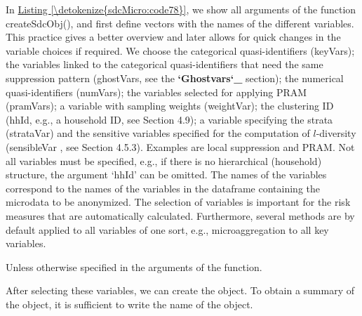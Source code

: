 \documentclass[letterpaper,10pt,english]{sphinxmanual}
\begin{document}
In \hyperref[\detokenize{sdcMicro:code78}]{Listing \ref{\detokenize{sdcMicro:code78}}}, we show all arguments of the function createSdcObj(),
and first define vectors with the names of the different variables. This
practice gives a better overview and later allows for quick changes in
the variable choices if required. We choose the categorical
quasi-identifiers (keyVars); the variables linked to the categorical
quasi-identifiers that need the same suppression pattern (ghostVars, see the
{\color{red}\bfseries{}{}`Ghostvars{}`\_} section); the numerical quasi-identifiers (numVars); the variables
selected for applying PRAM (pramVars); a variable with sampling weights
(weightVar); the clustering ID (hhId, e.g., a household ID, see Section
4.9); a variable specifying the strata (strataVar) and the sensitive
variables specified for the computation of \(l\)-diversity
(sensibleVar , see Section 4.5.3).  Examples are local suppression and
PRAM. Not all variables must be specified, e.g., if there is no
hierarchical (household) structure, the argument ‘hhId’ can be omitted.
The names of the variables correspond to the names of the variables in
the dataframe containing the microdata to be anonymized. The selection
of variables is important for the risk measures that are automatically
calculated. Furthermore, several methods are by default applied to all
variables of one sort, e.g., microaggregation to all key
variables. %
\begin{footnote}[8]\sphinxAtStartFootnote
Unless otherwise specified in the arguments of the function.
%
\end{footnote} After selecting these variables, we can
create the  object. To obtain a summary of the object, it is
sufficient to write the name of the object.
\end{document}
